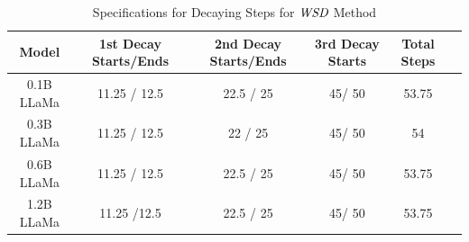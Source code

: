 \begin{table}[h!]
\centering
\begin{tabular}{cccccc}
\toprule
\textbf{Model} & \textbf{1st Decay Starts/Ends} & \textbf{2nd Decay Starts/Ends} & \textbf{3rd Decay Starts} & \textbf{Total Steps} \\
\midrule
0.1B LLaMa & 11.25 / 12.5 & 22.5 / 25 & 45/ 50 & 53.75 \\
0.3B LLaMa & 11.25 / 12.5 & 22 / 25 & 45/ 50 & 54 \\
0.6B LLaMa & 11.25 / 12.5 & 22.5 / 25 &  45/ 50  & 53.75 \\
1.2B LLaMa & 11.25 /12.5 & 22.5 / 25 &  45/ 50  &  53.75\\
\bottomrule
\end{tabular}
\caption{Specifications for Decaying Steps for $\textit{WSD}$ Method}
\label{tab:llama_models_wsd}
\end{table}






